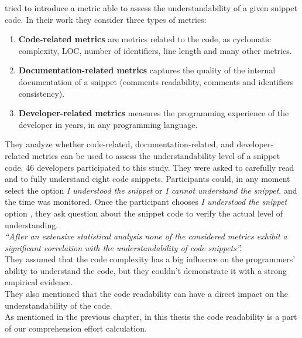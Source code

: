 \documentclass[12pt,mscthesis]{usiinfthesis}
\begin{document}
	\newpage
	\citet{Scalabrino} tried to introduce a metric able to assess the understandability of a given snippet code. In their work they consider three types of metrics:
	\begin{enumerate}
		\item \textbf{Code-related metrics} are metrics related to the code, as cyclomatic complexity, LOC,  number of identifiers, line length and many other metrics.
		\item \textbf{Documentation-related metrics} captures the quality of the internal documentation of a snippet (comments readability, comments and identifiers consistency). 
		\item \textbf{Developer-related metrics} measures the programming experience of the developer in years, in any programming language.
	\end{enumerate}
	They analyze whether code-related, documentation-related, and developer- related metrics can be used to assess the understandability level of a snippet  code.
	46 developers participated to this study. They were asked to carefully read and to fully understand eight code snippets. Participants could, in any moment select the option \textit{I understood the snippet} or \textit{I cannot understand the snippet}, and the time was monitored.
	Once the participant chooses \textit{I understood the snippet} option , they ask question about the snippet code to verify the actual level of understanding.\\ 
	\textit{``After an extensive statistical analysis none of the considered metrics exhibit a significant correlation with the understandability of code snippets''.}\\
	They assumed that the code complexity has a big influence on the programmers' ability to understand the code, but they couldn't demonstrate it with a strong empirical evidence.\\
	They also mentioned that the code readability can have a direct impact on the understandability of the code.\\ As mentioned in the previous chapter, in this thesis the code readability is a part of our comprehension effort calculation.\\
\end{document}

